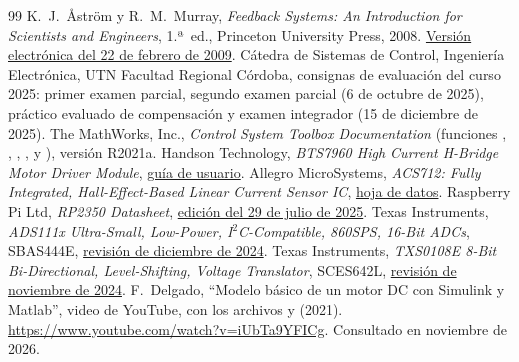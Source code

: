 \begin{thebibliography}{99}
 K.~J.~Åström y R.~M.~Murray, \emph{Feedback Systems: An Introduction for Scientists and Engineers}, 1.ª~ed., Princeton University Press, 2008. \href{https://www.cds.caltech.edu/~murray/books/AM08/pdf/am08-complete_22Feb09.pdf}{Versión electrónica del 22 de febrero de 2009}.
 Cátedra de Sistemas de Control, Ingeniería Electrónica, UTN Facultad Regional Córdoba, consignas de evaluación del curso 2025: primer examen parcial, segundo examen parcial (6 de octubre de 2025), práctico evaluado de compensación y examen integrador (15 de diciembre de 2025).
 The MathWorks, Inc., \emph{Control System Toolbox Documentation} (funciones , , , ,  y ), versión R2021a.
 Handson Technology, \emph{BTS7960 High Current H-Bridge Motor Driver Module}, \href{https://www.handsontec.com/dataspecs/module/BTS7960\%20Motor\%20Driver.pdf}{guía de usuario}.
 Allegro MicroSystems, \emph{ACS712: Fully Integrated, Hall-Effect-Based Linear Current Sensor IC}, \href{https://www.allegromicro.com/-/media/files/datasheets/acs712-datasheet.pdf}{hoja de datos}.
 Raspberry Pi Ltd, \emph{RP2350 Datasheet}, \href{https://pip-assets.raspberrypi.com/categories/1214-rp2350/documents/RP-008373-DS-2-rp2350-datasheet.pdf}{edición del 29 de julio de 2025}.
 Texas Instruments, \emph{ADS111x Ultra-Small, Low-Power, I$^2$C-Compatible, 860SPS, 16-Bit ADCs}, SBAS444E, \href{https://www.ti.com/lit/ds/symlink/ads1115.pdf}{revisión de diciembre de 2024}.
 Texas Instruments, \emph{TXS0108E 8-Bit Bi-Directional, Level-Shifting, Voltage Translator}, SCES642L, \href{https://www.ti.com/lit/ds/symlink/txs0108e.pdf}{revisión de noviembre de 2024}.
 F.~Delgado, ``Modelo básico de un motor DC con Simulink y Matlab'', video de YouTube, con los archivos  y  (2021). \url{https://www.youtube.com/watch?v=iUbTa9YFICg}. Consultado en noviembre de 2026.
\end{thebibliography}
